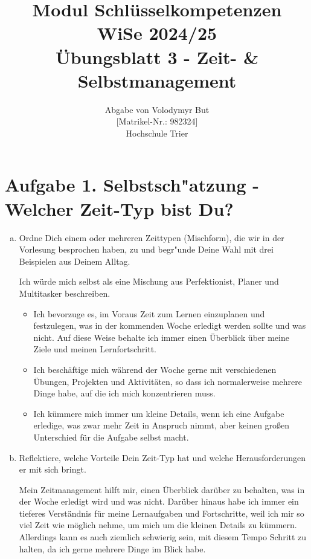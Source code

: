\documentclass[10pt, oneside]{article}
\title{Modul Schl{\"u}sselkompetenzen\\[10pt]\Large{WiSe 2024/25}\\[15pt]\Large{{\"U}bungsblatt 3 - Zeit- \& Selbstmanagement}}
\author{Abgabe von Volodymyr But\\[5pt][Matrikel-Nr.: 982324]\\[10pt]Hochschule Trier}
\date{}
\begin{document}
\maketitle
\vspace{25px}

\section{Aufgabe 1. Selbstsch"atzung - Welcher Zeit-Typ bist Du?}

\begin{enumerate}[(a)]
    \item Ordne Dich einem oder mehreren Zeittypen (Mischform), die wir in der Vorlesung besprochen haben,
        zu und begr"unde Deine Wahl mit drei Beispielen aus Deinem Alltag.

        Ich würde mich selbst als eine Mischung aus Perfektionist, Planer und
        Multitasker beschreiben.
        \begin{itemize}
            \item Ich bevorzuge es, im Voraus Zeit zum Lernen einzuplanen und
                festzulegen, was in der kommenden Woche erledigt werden sollte
                und was nicht. Auf diese Weise behalte ich immer einen
                Überblick über meine Ziele und meinen Lernfortschritt.
            \item Ich beschäftige mich während der Woche gerne mit
                verschiedenen Übungen, Projekten und Aktivitäten, so dass ich
                normalerweise mehrere Dinge habe, auf die ich mich
                konzentrieren muss.
            \item Ich kümmere mich immer um kleine Details, wenn ich eine
                Aufgabe erledige, was zwar mehr Zeit in Anspruch nimmt, aber
                keinen großen Unterschied für die Aufgabe selbst macht.
        \end{itemize}

    \item Reflektiere, welche Vorteile Dein Zeit-Typ hat und welche
        Herausforderungen er mit sich bringt.

        Mein Zeitmanagement hilft mir, einen Überblick darüber zu behalten, was
        in der Woche erledigt wird und was nicht. Darüber hinaus habe ich immer
        ein tieferes Verständnis für meine Lernaufgaben und Fortschritte, weil
        ich mir so viel Zeit wie möglich nehme, um mich um die kleinen Details
        zu kümmern. Allerdings kann es auch ziemlich schwierig sein, mit diesem
        Tempo Schritt zu halten, da ich gerne mehrere Dinge im Blick habe.
\end{enumerate}
\end{document}
